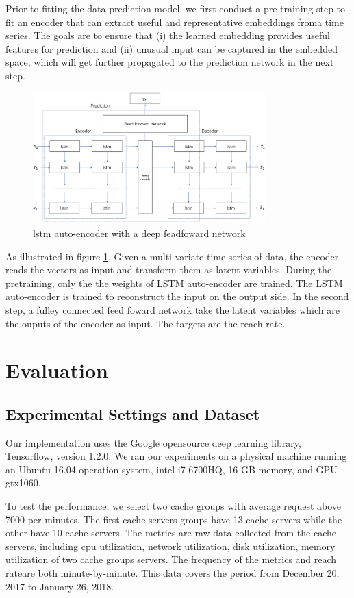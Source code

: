 \documentclass[5p]{elsarticle}
\newcommand{\dabiaolv}{reach rate}
\begin{document}
Prior to fitting the data prediction model, we first conduct a pre-training step to fit an encoder that can extract useful and representative embeddings froma  time  series.  The  goals  are  to  ensure  that  (i)  the  learned embedding  provides  useful  features  for  prediction  and  (ii) unusual input can be captured in the embedded space, which will get further propagated to the prediction network in the next step.

\begin{figure}[h]
    \centering
    \includegraphics[width=0.8\textwidth]{our_models.png}
    \caption{lstm auto-encoder with a deep feadfoward network}
    \label{fig:our_models}
\end{figure}

As illustrated in figure \ref{fig:our_models}. Given a multi-variate time series of data, the encoder reads the vectors as input and transform them as latent variables. During the pretraining, only the the weights of LSTM auto-encoder are trained. The LSTM auto-encoder is trained to reconstruct the input on the output side. In the second step, a fulley connected feed foward network take the latent variables which are the ouputs of the encoder as input. The targets are the \dabiaolv.
\section{Evaluation}
\subsection{Experimental Settings and Dataset}
Our implementation uses the Google opensource deep learning library, Tensorflow\cite{TensorFlow}, version 1.2.0. We ran our experiments on a physical machine running an Ubuntu 16.04 operation system, intel i7-6700HQ, 16 GB memory, and GPU gtx1060.

To test the performance, we select two cache groups with average request above 7000 per minutes. The first cache servers groups have 13 cache servers while the other have 10 cache servers. The  metrics are raw data collected from the cache servers, including cpu utilization, network utilization, disk utilization, memory utilization of two cache groups servers. The frequency of the metrics and  \dabiaolv are both minute-by-minute. This data covers the period from December 20, 2017 to January 26, 2018.
\end{document}
